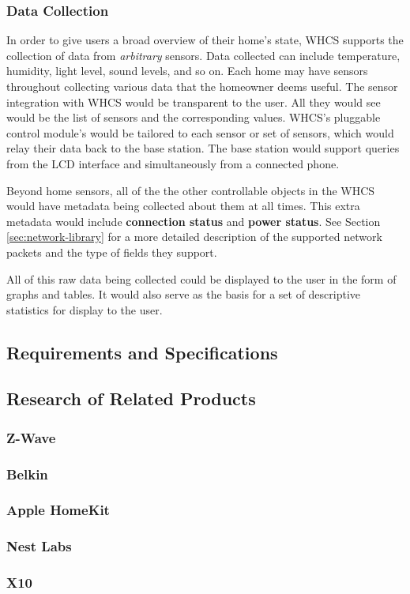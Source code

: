 \subsubsection{Data Collection}
In order to give users a broad overview of their home's state, WHCS supports
the collection of data from \emph{arbitrary} sensors. Data collected can
include temperature, humidity, light level, sound levels, and so on. Each home
may have sensors throughout collecting various data that the homeowner deems
useful. The sensor integration with WHCS would be transparent to the user. All
they would see would be the list of sensors and the corresponding values.
WHCS's pluggable control module's would be tailored to each sensor or set of
sensors, which would relay their data back to the base station. The base
station would support queries from the LCD interface and simultaneously from a
connected phone.

Beyond home sensors, all of the the other controllable objects in the WHCS
would have metadata being collected about them at all times. This extra metadata
would include \textbf{connection status} and \textbf{power status}. See Section
\ref{sec:network-library} for a more detailed description of the supported
network packets and the type of fields they support.

All of this raw data being collected could be displayed to the user in the form
of graphs and tables. It would also serve as the basis for a set of descriptive
statistics for display to the user.

\subsection{Requirements and Specifications}

\subsection{Research of Related Products}

\subsubsection{Z-Wave}

\subsubsection{Belkin}

\subsubsection{Apple HomeKit}

\subsubsection{Nest Labs}

\subsubsection{X10}


